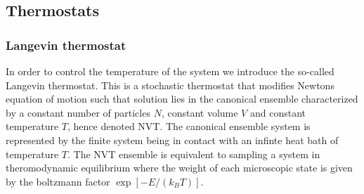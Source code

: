 

\subsection{Thermostats}

\subsubsection*{Langevin thermostat}



In order to control the temperature of the system we introduce the so-called Langevin thermostat. This is a stochastic thermostat that modifies Newtons equation of motion such that solution lies in the canonical ensemble characterized by a constant number of particles $N$, constant volume $V$ and constant temperature $T$, hence denoted NVT. The canonical ensemble system is represented by the finite system being in contact with an infinte heat bath of temperature $T$. The NVT ensemble is equivalent to sampling a system in theromodynamic equilibrium where the weight of each microscopic state is given by the boltzmann factor $\exp[-E/(k_B T)]$.

